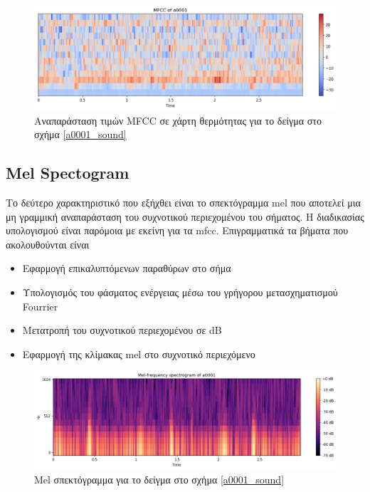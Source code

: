 \documentclass[../main.tex]{subfiles}
\begin{document}
\begin{figure}[H]
	\includegraphics[width=\textwidth]{../images/a0001_mfcc.png}
	\caption{Αναπαράσταση τιμών MFCC σε χάρτη θερμότητας για το δείγμα στο σχήμα
		\ref{a0001_sound}}
	\label{a0001_mfcc}
\end{figure}

\subsection{Mel Spectogram}

Το δεύτερο χαρακτηριστικό που εξήχθει είναι το σπεκτόγραμμα mel που αποτελεί
μια μη γραμμική αναπαράσταση του συχνοτικού περιεχομένου του σήματος. Η
διαδικασίας υπολογισμού είναι παρόμοια με εκείνη για τα mfcc. Επιγραμματικά τα
βήματα που ακολουθούνται είναι \cite{melspectogram}

\begin{itemize}
	\item Εφαρμογή επικαλυπτόμενων παραθύρων στο σήμα
	\item Υπολογισμός του φάσματος ενέργειας μέσω του γρήγορου μετασχηματισμού
	      Fourrier
	\item Μετατροπή του συχνοτικού περιεχομένου σε dB
	\item Εφαρμογή της κλίμακας mel στο συχνοτικό περιεχόμενο
\end{itemize}

\begin{figure}[H]
	\includegraphics[width=\textwidth]{../images/a0001_spectogram.png}
	\caption{Mel σπεκτόγραμμα για το δείγμα στο σχήμα \ref{a0001_sound}}
	\label{a0001_spectogram}
\end{figure}
\end{document}
